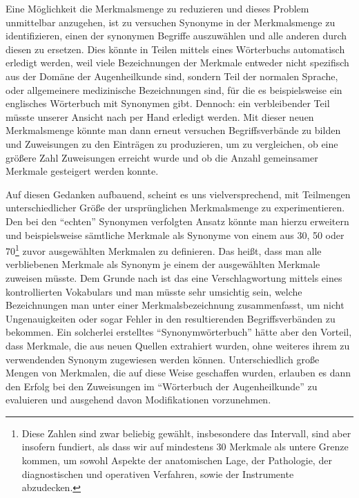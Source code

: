 \documentclass[pagesize,paper=A4,DIV=calc,fontsize=12pt,draft=false]{scrreprt}
\begin{document}
Eine Möglichkeit die Merkmalsmenge zu reduzieren und dieses Problem unmittelbar anzugehen, ist zu versuchen Synonyme in der Merkmalsmenge zu identifizieren, einen der synonymen Begriffe auszuwählen und alle anderen durch diesen zu ersetzen.
Dies könnte in Teilen mittels eines Wörterbuchs automatisch erledigt werden, weil viele Bezeichnungen der Merkmale entweder nicht spezifisch aus der Domäne der Augenheilkunde sind, sondern Teil der normalen Sprache, oder allgemeinere medizinische Bezeichnungen sind, für die es beispielsweise ein englisches Wörterbuch mit Synonymen gibt.
Dennoch: ein verbleibender Teil müsste unserer Ansicht nach per Hand erledigt werden.
Mit dieser neuen Merkmalsmenge könnte man dann erneut versuchen Begriffsverbände zu bilden und Zuweisungen zu den Einträgen zu produzieren, um zu vergleichen, ob eine größere Zahl Zuweisungen erreicht wurde und ob die Anzahl gemeinsamer Merkmale gesteigert werden konnte.

Auf diesen Gedanken aufbauend, scheint es uns vielversprechend, mit Teilmengen unterschiedlicher Größe der ursprünglichen Merkmalsmenge zu experimentieren.
Den bei den \enquote{echten} Synonymen verfolgten Ansatz könnte man hierzu erweitern und beispielsweise sämtliche Merkmale als Synonyme von einem aus 30, 50 oder 70\footnote{Diese Zahlen sind zwar beliebig gewählt, insbesondere das Intervall, sind aber insofern fundiert, als dass wir auf mindestens 30 Merkmale als untere Grenze kommen, um sowohl Aspekte der anatomischen Lage, der Pathologie, der diagnostischen und operativen Verfahren, sowie der Instrumente abzudecken.} zuvor ausgewählten Merkmalen zu definieren.
Das heißt, dass man alle verbliebenen Merkmale als Synonym je einem der ausgewählten Merkmale zuweisen müsste.
Dem Grunde nach ist das eine Verschlagwortung mittels eines kontrollierten Vokabulars und man müsste sehr umsichtig sein, welche Bezeichnungen man unter einer Merkmalsbezeichnung zusammenfasst, um nicht Ungenauigkeiten oder sogar Fehler in den resultierenden Begriffsverbänden zu bekommen.
Ein solcherlei erstelltes \enquote{Synonymwörterbuch} hätte aber den Vorteil, dass Merkmale, die aus neuen Quellen extrahiert wurden, ohne weiteres ihrem zu verwendenden Synonym zugewiesen werden können.
Unterschiedlich große Mengen von Merkmalen, die auf diese Weise geschaffen wurden, erlauben es dann den Erfolg bei den Zuweisungen im \enquote{Wörterbuch der Augenheilkunde} zu evaluieren und ausgehend davon Modifikationen vorzunehmen.
\end{document}
